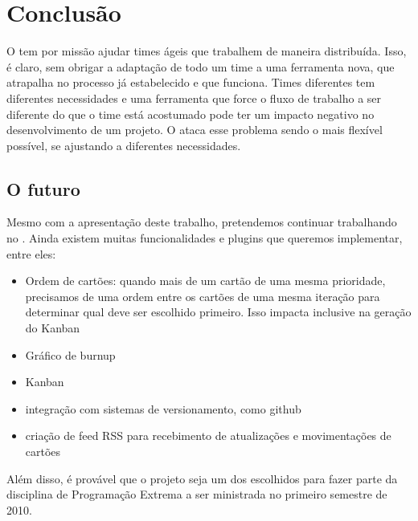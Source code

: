 \section{Conclusão}

O \calopsita{} tem por missão ajudar times ágeis que trabalhem de maneira distribuída. Isso, é claro, sem obrigar
a adaptação de todo um time a uma ferramenta nova, que atrapalha no processo já estabelecido e que funciona. Times
diferentes tem diferentes necessidades e uma ferramenta que force o fluxo de trabalho a ser diferente do que o time 
está acostumado pode ter um impacto negativo no desenvolvimento de um projeto. O \calopsita{} ataca esse problema
sendo o mais flexível possível, se ajustando a diferentes necessidades.

\subsection{O futuro}

Mesmo com a apresentação deste trabalho, pretendemos continuar trabalhando no \calopsita{}. Ainda existem muitas funcionalidades
e plugins que queremos implementar, entre eles:

\begin{itemize}
	\item{Ordem de cartões: quando mais de um cartão de uma mesma prioridade, precisamos de uma ordem entre os cartões de uma
	mesma iteração para determinar qual deve ser escolhido primeiro. Isso impacta inclusive na geração do Kanban}
	\item{Gráfico de burnup}
	\item{Kanban}
	\item{integração com sistemas de versionamento, como github}
	\item{criação de feed RSS para recebimento de atualizações e movimentações de cartões}
\end{itemize}

Além disso, é provável que o projeto seja um dos escolhidos para fazer parte da disciplina de Programação Extrema a ser
ministrada no primeiro semestre de 2010.
